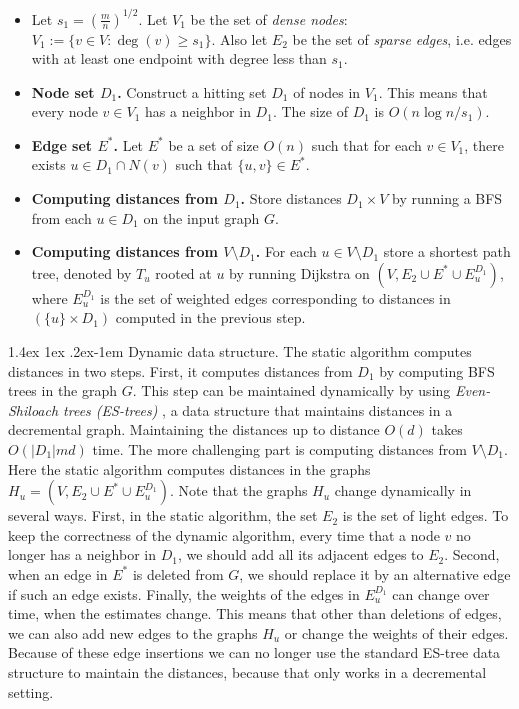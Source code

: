 \documentclass[11pt]{article}
\makeatletter
\theoremstyle{definition}
\theoremstyle{remark}
\renewcommand{\paragraph}{%
  \@startsection{paragraph}{4}%
  {\z@}{1.4ex \@plus 1ex \@minus .2ex}{-1em}%
  {\normalfont\normalsize\bfseries}%
}
\makeatother
\begin{document}
\begin{titlepage}
\begin{itemize}
    \setlength\itemsep{0em}
    \item Let $s_1= (\frac{m}{n})^{1/2}$. Let $V_1$ be the set of \textit{dense nodes}: $V_1:= \{ v \in V: \deg(v) \geq s_1\}$. Also let $E_2$ be the set of \textit{sparse edges}, i.e. edges with at least one endpoint with degree less than $s_1$.
    \item \textbf{Node set $D_1$.} Construct a hitting set $D_1$ of nodes in $V_1$. %
    This means that every node $v \in V_1$ has a neighbor in $D_1$. The size of $D_1$ is $O(n \log{n}/s_1)$.
    \item \textbf{Edge set $E^*$.} Let $E^*$ be a set of size $O(n)$ such that for each $v \in V_1$, there exists $u \in D_1 \cap N(v)$ such that $\{u,v\} \in E^*$.
    \item \textbf{Computing distances from $D_1$.} Store distances $D_1 \times V$ by running a BFS from each $u \in D_1$ on the input graph $G$. 
    \item \textbf{Computing distances from $V \setminus D_1$. } For each $u \in V \setminus D_1$ store a shortest path tree, denoted by $T_u$  rooted at $u$ by running Dijkstra on $(V, E_2 \cup E^* \cup E^{D_1}_u)$, where $E^{D_1}_u$ is the set of weighted edges corresponding to distances in $(\{u\} \times D_1)$ computed in the previous step. 
\end{itemize}

\paragraph{Dynamic data structure.} 
The static algorithm computes distances in two steps. First, it computes distances from $D_1$ by computing BFS trees in the graph $G$. This step can be maintained dynamically by using \emph{Even-Shiloach trees (ES-trees)} \cite{ES81}, a data structure that maintains distances in a decremental graph. Maintaining the distances up to distance $O(d)$ takes $O(|D_1|md)$ time.
The more challenging part is computing distances from $V \setminus D_1$. Here the static algorithm computes distances in the graphs $H_u=(V, E_2 \cup E^* \cup E^{D_1}_u)$. Note that the graphs $H_u$ change dynamically in several ways. First, in the static algorithm, the set $E_2$ is the set of light edges. To keep the correctness of the dynamic algorithm, every time that a node $v$ no longer has a neighbor in $D_1$, we should add all its adjacent edges to $E_2$. Second, when an edge in $E^*$ is deleted from $G$, we should replace it by an alternative edge if such an edge exists. Finally, the weights of the edges in $E^{D_1}_u$ can change over time, when the estimates change. This means that other than deletions of edges, we can also add new edges to the graphs $H_u$ or change the weights of their edges. Because of these edge insertions we can no longer use the standard ES-tree data structure to maintain the distances, because that only works in a decremental setting. 


\end{titlepage}
\end{document}
